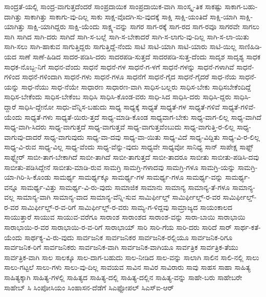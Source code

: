 {ಸಾಂದ್ರತೆ-ಯಲ್ಲಿ
ಸಾಂದ್ರ-ವಾಗುತ್ತದೆಂದರೆ
ಸಾಂಪ್ರದಾಯಿಕ
ಸಾಂಪ್ರದಾಯಿಕ-ವಾಗಿ
ಸಾಂಸ್ಕೃ-ತಿಕ
ಸಾಕಷ್ಟು
ಸಾಕಾಗ-ಬಹು-ದಾಗಿತ್ತು
ಸಾಕಾಗಿತ್ತು
ಸಾಕಾಗು-ವು-ದಿಲ್ಲ
ಸಾಕು
ಸಾಕ್ಷ-ವೊದಗಿ-ಸು-ವುದಕ್ಕೆ
ಸಾಕ್ಷಿ
ಸಾಕ್ಷಿ-ಯಂತಿದೆ
ಸಾಕ್ಷಿ-ಯಾಗಿ
ಸಾಕ್ಷಿ-ಯಾಗಿತ್ತು
ಸಾಕ್ಷಿ-ಯಾಗಿದ್ದರು
ಸಾಕ್ಷಿ-ಯೆಂದು
ಸಾಕ್ಷ್ಯ-ವನ್ನು
ಸಾಗರ
ಸಾಗ-ರಕ್ಕೆ
ಸಾಗ-ರದ
ಸಾಗ-ರವೂ
ಸಾಗರವೇ
ಸಾಗಲು
ಸಾಗಿ
ಸಾಗಿದ
ಸಾಗಿ-ದರು
ಸಾಗಿದೆ
ಸಾಗಿ-ಸ-ಬಲ್ಲೆ
ಸಾಗಿ-ಸ-ಬೇಕಾದರೆ
ಸಾಗಿ-ಸ-ಲಾಗು-ವು-ದಿಲ್ಲ
ಸಾಗಿ-ಸ-ಲಾ-ಯಿತು
ಸಾಗಿ-ಸಲು
ಸಾಗಿ-ಹಾಕುವ
ಸಾಗುತ್ತಿದ್ದರು
ಸಾಗುತ್ತಿದ್ದೆ-ನೆಂದು
ಸಾಟಿ
ಸಾಟಿ-ಯಾಗಿ
ಸಾಟಿ-ಯಾರು
ಸಾಟಿ-ಯಿಲ್ಲ
ಸಾಣಿಹಿಡಿ-ಯದ
ಸಾಣೆ
ಸಾಣೆ-ಹಿಡಿದ
ಸಾದರ-ಪಡಿಸಿ-ದರು
ಸಾದರಪಡಿ-ಸುತ್ತದೆ
ಸಾದರಪಡಿ-ಸುತ್ತ-ದೆಂದು
ಸಾದೃಶ
ಸಾದೃಶ್ಯ
ಸಾಧಕ
ಸಾಧಕ-ನೊಬ್ಬ-ನಿಗೆ
ಸಾಧನ-ವೆಂದು
ಸಾಧನೆ
ಸಾಧನೆ-ಗಳ
ಸಾಧನೆ-ಗ-ಳಗೆ
ಸಾಧನೆ-ಗಳನ್ನು
ಸಾಧನೆ-ಗಳಾಗಿವೆ
ಸಾಧನೆ-ಗಳಿಂದ
ಸಾಧನೆ-ಗಳಿಂದಾಗಿ
ಸಾಧನೆ-ಗಳು
ಸಾಧನೆ-ಗಳೂ
ಸಾಧನೆಗೆ
ಸಾಧನೆ-ಗೈದ
ಸಾಧನೆ-ಗೈದರೆ
ಸಾಧ-ನೆಯ
ಸಾಧನೆ-ಯನ್ನು
ಸಾಧ-ನೆಯು
ಸಾಧ-ನೆಯೇ
ಸಾಧಾರಣ
ಸಾಧಾರಣ-ವಾಗಿ
ಸಾಧಿಸ-ಬಲ್ಲರು
ಸಾಧಿಸ-ಬೇಕು
ಸಾಧಿಸಬೇಕೆಂದಿದ್ದೆ
ಸಾಧಿಸ-ಬೇಕೆಂದು
ಸಾಧಿಸ-ಬೇಕೆಂಬ
ಸಾಧಿಸಿ
ಸಾಧಿಸಿ-ಕೊಂಡ-ವರು
ಸಾಧಿ-ಸಿದ
ಸಾಧಿಸಿ-ದರು
ಸಾಧಿಸಿ-ದ್ದರು
ಸಾಧಿಸಿ-ದ್ದಾರೆ
ಸಾಧಿಸಿ-ದ್ದೇನೋ
ಸಾಧು-ವೆನ್ನಿಸ-ಬಹುದು
ಸಾಧ್ಯ
ಸಾಧ್ಯಕ್ಕೆ
ಸಾಧ್ಯತೆ
ಸಾಧ್ಯತೆ-ಗಳ
ಸಾಧ್ಯತೆ-ಗಳಿವೆ
ಸಾಧ್ಯತೆ-ಗಳಿವೆ-ಯೆಂದು
ಸಾಧ್ಯತೆ-ಗಳು
ಸಾಧ್ಯತೆ-ಯಿರು-ತ್ತದೆ
ಸಾಧ್ಯ-ಮಾಡಿ-ಕೊಂಡ
ಸಾಧ್ಯವಾಗ-ಬೇಕು
ಸಾಧ್ಯ-ವಾಗ-ಲಿಲ್ಲ
ಸಾಧ್ಯ-ವಾಗಿದೆ
ಸಾಧ್ಯ-ವಾಗಿ-ಸಿದರು
ಸಾಧ್ಯ-ವಾಗುತ್ತದೆ
ಸಾಧ್ಯ-ವಾಗುತ್ತವೆ
ಸಾಧ್ಯ-ವಾಗುತ್ತವೆಂಬುದು
ಸಾಧ್ಯ-ವಾಗುತ್ತಿ-ರ-ಲಿಲ್ಲ
ಸಾಧ್ಯ-ವಾಗುವು-ದಾದರೆ
ಸಾಧ್ಯ-ವಾಗುವುದು
ಸಾಧ್ಯ-ವಾ-ದವು
ಸಾಧ್ಯ-ವಾ-ಯಿತು
ಸಾಧ್ಯ-ವಿದೆ
ಸಾಧ್ಯ-ವಿದ್ದಿತು
ಸಾಧ್ಯ-ವಿ-ರ-ಲಿಲ್ಲ
ಸಾಧ್ಯ-ವಿ-ರುವ
ಸಾಧ್ಯ-ವಿಲ್ಲ
ಸಾಧ್ಯ-ವೆಂದು
ಸಾಧ್ಯ-ವೆನ್ನು-ವುದು
ಸಾಧ್ಯವೇ
ಸಾಧ್ಯವೋ
ಸಾನಿಧ್ಯ
ಸಾನ್
ಸಾಪೇಕ್ಷ
ಸಾಫ್ಟ್
ಸಾಫ್ಟ್ವೇರ್
ಸಾಬೀ-ತಾಗ-ಬೇಕಾಗಿದೆ
ಸಾಬೀ-ತಾಗಿದೆ
ಸಾಬೀ-ತಾಗುತ್ತದೆ
ಸಾಬೀ-ತಾದರೂ
ಸಾಬೀತು
ಸಾಬೀತು-ಪಡಿಸಿ-ದವು
ಸಾಬೀತು-ಪಡಿಸಿದ್ದೇನೆ
ಸಾಬೀತು-ಮಾಡಿ-ರುವ
ಸಾಮಗ್ರಿ
ಸಾಮಗ್ರಿ-ಗಳಾದವು
ಸಾಮಗ್ರಿ-ಗಳೂ
ಸಾಮಗ್ರಿ-ಯನ್ನು
ಸಾಮಗ್ರಿ-ಯಾ-ಗಿರಿ-ಸಿ-ಕೊಂಡು
ಸಾಮರ್ಥ್ಯ
ಸಾಮರ್ಥ್ಯಕ್ಕೂ
ಸಾಮರ್ಥ್ಯ-ಗಳ
ಸಾಮರ್ಥ್ಯ-ಗಳೂ
ಸಾಮರ್ಥ್ಯ-ವನ್ನು
ಸಾಮರ್ಥ್ಯ-ವನ್ನೂ
ಸಾಮರ್ಥ್ಯ-ವಿತ್ತು
ಸಾಮರ್ಥ್ಯ-ವಿ-ರು-ವುದು
ಸಾಮಾಜಿಕ
ಸಾಮಾನು
ಸಾಮಾನ್ಯ
ಸಾಮಾನ್ಯ-ತೆ-ಗಳೂ
ಸಾಮಾನ್ಯ-ವಲ್ಲ
ಸಾಮಾನ್ಯ-ವಾಗಿ
ಸಾಮಾನ್ಯ-ವಾದ
ಸಾಮಾನ್ಯ-ವೆನ್ನಿ-ಸುವ
ಸಾಮಿರ್ಫೀಲ್ಡ್
ಸಾಮಿರ್ಫೀಲ್ಡ್-ರ-ವರ
ಸಾಮಿರ್ಫೀಲ್ಡ್-ರ-ವರ
ಸಾಮಿರ್ಫೀಲ್ಡ್-ರ-ವ-ರಿಗೆ
ಸಾಮಿರ್ಫೀಲ್ಡ್-ರ-ವರು
ಸಾಮ್ಯ-ಗ-ಳಿದ್ದವು
ಸಾಮ್ರಾಜ್ಯದ
ಸಾಯಂಕಾಲದ
ಸಾಯುತ್ತಾರೆ
ಸಾಯುವ
ಸಾಯುವ-ವರೆಗೂ
ಸಾರಾಂಶ
ಸಾರಾಂಶದ
ಸಾರಾಂಶ-ವನ್ನು
ಸಾರಾ-ಬಾಯಿ
ಸಾರಾಭಾಯಿ
ಸಾರಾಭಾಯಿ-ರ-ವರ
ಸಾರಾಭಾಯಿ-ರ-ವ-ರಿಗೆ
ಸಾರಾಭಾಯ್
ಸಾರಿ
ಸಾರಿ-ಗೆಯ
ಸಾರಿ-ದರು
ಸಾರಿದೆ
ಸಾರ್
ಸಾರ್ಥ-ಕತೆ-ಯೆಂದು
ಸಾರ್ಥಕ್ಯ-ವಿ-ರು-ವುದು
ಸಾರ್ವಜನಿಕ
ಸಾರ್ವಜನಿಕರ
ಸಾರ್ವಜನಿಕ-ರಲ್ಲಿಯೂ
ಸಾರ್ವಜನಿಕ-ರಿಗೂ
ಸಾರ್ವಜನಿಕ-ರಿಗೆ
ಸಾರ್ವಜನಿಕರು
ಸಾರ್ವಜನಿಕ-ವಾಗಿ
ಸಾರ್ವಜನಿಕ-ವಾಗಿಯೂ
ಸಾರ್ವತ್ರಿಕ
ಸಾರ್ವತ್ರಿಕ-ತೆಯು
ಸಾರ್ವತ್ರಿಕ-ವಾಗಿ
ಸಾಲ
ಸಾಲಕ್ಕೂ
ಸಾಲ-ದಾಗ-ಬಹುದು
ಸಾಲ-ನೀಡಿದ
ಸಾಲ-ವನ್ನು
ಸಾಲಾಗಿ
ಸಾಲಿನ
ಸಾಲಿ-ನಲ್ಲಿ
ಸಾಲು
ಸಾಲು-ಗಟ್ಟಲೆ
ಸಾಲು-ಗಳು
ಸಾಲು-ವು-ದಿಲ್ಲ
ಸಾವಯವ
ಸಾವಿನ
ಸಾವಿರ
ಸಾವಿರಾರು
ಸಾವು
ಸಾಹಸ
ಸಾಹಾ
ಸಾಹಿತ್ಯ
ಸಾಹಿತ್ಯಕ್ಕಾಗಿ
ಸಾಹಿತ್ಯ-ಗಳಲ್ಲಿ
ಸಾಹಿತ್ಯದ
ಸಾಹಿತ್ಯ-ದಲ್ಲಿ
ಸಾಹಿತ್ಯ-ದಲ್ಲಿನ
ಸಾಹಿತ್ಯ-ವನ್ನು
ಸಾಹೇ-ಬರು
ಸಾಹೇಬರೇ
ಸಾಹೇಬ್
ಸಿ
ಸಿಂಪೋಸಿಯಂ
ಸಿಂಹಾಸನ-ದೆಡೆಗೆ
ಸಿಎಫ್ಪೋಪಲ್
ಸಿಎಸ್ಐ-ಆರ್
}
